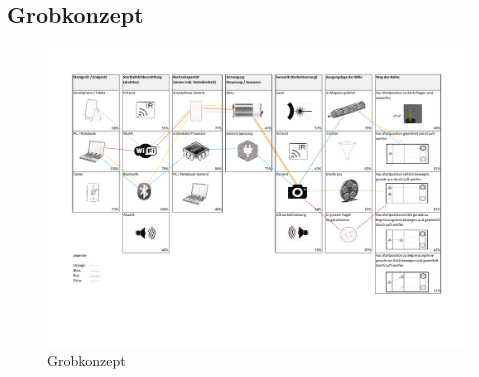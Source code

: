 \begin{landscape}
	\section{Grobkonzept}
		\begin{figure}[h!]
			\includegraphics[page=1,scale=0.9,clip,trim=17mm 37mm 21mm 19mm]{Morphologie/Bilder/Grobkonzept.pdf}
			\centering
			\caption{Grobkonzept} 
			\label{abb:Grobkonzept}
		\end{figure}	
\end{landscape} 

